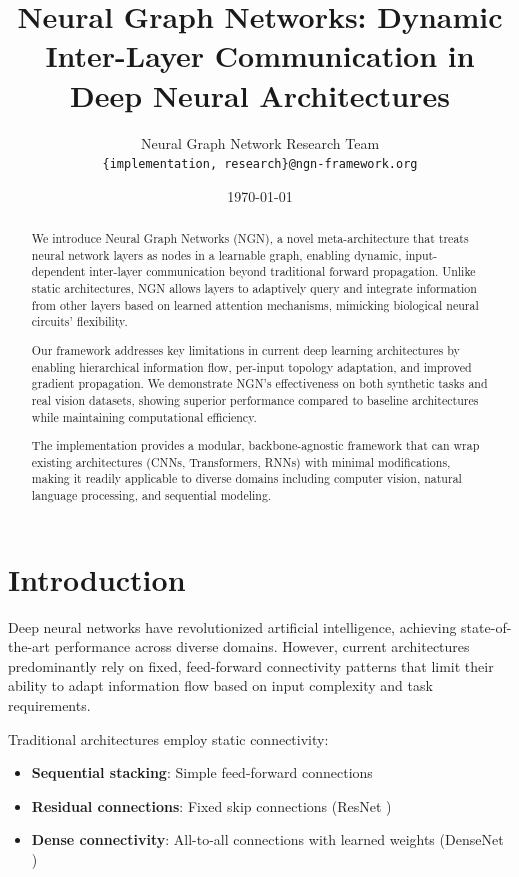 \documentclass[11pt]{article}
\title{Neural Graph Networks: Dynamic Inter-Layer Communication in Deep Neural Architectures}
\author{
    Neural Graph Network Research Team \\
    \texttt{\{implementation, research\}@ngn-framework.org}
}
\date{\today}
\begin{document}
\maketitle

\begin{abstract}
We introduce Neural Graph Networks (NGN), a novel meta-architecture that treats neural network layers as nodes in a learnable graph, enabling dynamic, input-dependent inter-layer communication beyond traditional forward propagation. Unlike static architectures, NGN allows layers to adaptively query and integrate information from other layers based on learned attention mechanisms, mimicking biological neural circuits' flexibility.

Our framework addresses key limitations in current deep learning architectures by enabling hierarchical information flow, per-input topology adaptation, and improved gradient propagation. We demonstrate NGN's effectiveness on both synthetic tasks and real vision datasets, showing superior performance compared to baseline architectures while maintaining computational efficiency.

The implementation provides a modular, backbone-agnostic framework that can wrap existing architectures (CNNs, Transformers, RNNs) with minimal modifications, making it readily applicable to diverse domains including computer vision, natural language processing, and sequential modeling.
\end{abstract}

\section{Introduction}

Deep neural networks have revolutionized artificial intelligence, achieving state-of-the-art performance across diverse domains. However, current architectures predominantly rely on fixed, feed-forward connectivity patterns that limit their ability to adapt information flow based on input complexity and task requirements.

Traditional architectures employ static connectivity:
\begin{itemize}
    \item \textbf{Sequential stacking}: Simple feed-forward connections
    \item \textbf{Residual connections}: Fixed skip connections (ResNet \cite{he2016deep})
    \item \textbf{Dense connectivity}: All-to-all connections with learned weights (DenseNet \cite{huang2017densely})
\end{itemize}
\end{document}

